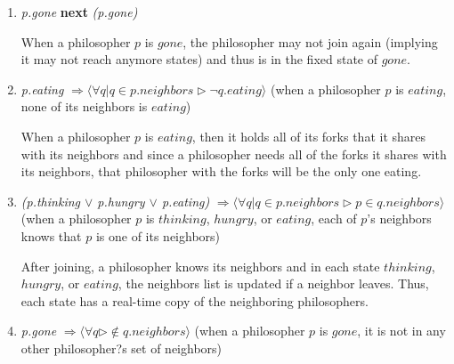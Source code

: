 \documentclass[11pt]{article}
\begin{document}
\begin{enumerate}[S1]
\item {\it p.gone} {\bfseries next} {\it (p.gone)}

When a philosopher $p$ is $gone$, the philosopher may not join again (implying it may not reach anymore states) and thus is in the fixed state of $gone$.

\item {\it p.eating} $\Rightarrow \langle \forall q | q \in p.neighbors \rhd \neg q.eating \rangle$
(when a philosopher $p$ is $eating$, none of its neighbors is $eating$)

When a philosopher $p$ is $eating$, then it holds all of its forks that it shares with its neighbors and since a philosopher needs all of the forks it shares with its neighbors, that philosopher with the forks will be the only one eating.


\item {\it (p.thinking $\vee$ p.hungry $\vee$ p.eating)} $\Rightarrow \langle \forall q | q \in p.neighbors \rhd p \in q.neighbors \rangle$
(when a philosopher $p$ is $thinking$, $hungry$, or $eating$, each of $p$'s neighbors knows that $p$ is one of its neighbors)

After joining, a philosopher knows its neighbors and in each state $thinking$, $hungry$, or $eating$, the neighbors list is updated if a neighbor leaves. Thus, each state has a real-time copy of the neighboring philosophers.


\item {\it p.gone} $\Rightarrow \langle \forall q  \rhd \not\in q.neighbors \rangle$
(when a philosopher $p$ is $gone$, it is not in any other philosopher?s set of neighbors)

\end{enumerate}
\end{document}
